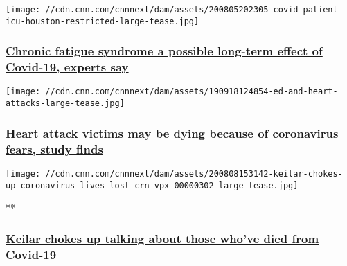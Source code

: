 \href{/2020/08/07/health/chronic-fatigue-syndrome-covid-19-survivors-wellness/index.html}{}

\texttt{[image: //cdn.cnn.com/cnnnext/dam/assets/200805202305-covid-patient-icu-houston-restricted-large-tease.jpg]}

\hypertarget{chronic-fatigue-syndrome-a-possible-long-term-effect-of-covid-19-experts-say-1}{%
\subsubsection{\texorpdfstring{\href{/2020/08/07/health/chronic-fatigue-syndrome-covid-19-survivors-wellness/index.html}{Chronic
fatigue syndrome a possible long-term effect of Covid-19, experts
say}}{Chronic fatigue syndrome a possible long-term effect of Covid-19, experts say}}\label{chronic-fatigue-syndrome-a-possible-long-term-effect-of-covid-19-experts-say-1}}

\href{/2020/08/07/health/heart-attack-avoid-hospital-covid-19-wellness/index.html}{}

\texttt{[image: //cdn.cnn.com/cnnnext/dam/assets/190918124854-ed-and-heart-attacks-large-tease.jpg]}

\hypertarget{heart-attack-victims-may-be-dying-because-of-coronavirus-fears-study-finds}{%
\subsubsection{\texorpdfstring{\href{/2020/08/07/health/heart-attack-avoid-hospital-covid-19-wellness/index.html}{Heart
attack victims may be dying because of coronavirus fears, study
finds}}{Heart attack victims may be dying because of coronavirus fears, study finds}}\label{heart-attack-victims-may-be-dying-because-of-coronavirus-fears-study-finds}}

\href{/videos/health/2020/08/07/keilar-chokes-up-coronavirus-lives-lost-crn-vpx.cnn}{}

\texttt{[image: //cdn.cnn.com/cnnnext/dam/assets/200808153142-keilar-chokes-up-coronavirus-lives-lost-crn-vpx-00000302-large-tease.jpg]}

**

\hypertarget{keilar-chokes-up-talking-about-those-whove-died-from-covid-19}{%
\subsubsection{\texorpdfstring{\href{/videos/health/2020/08/07/keilar-chokes-up-coronavirus-lives-lost-crn-vpx.cnn}{Keilar
chokes up talking about those who've died from
Covid-19}}{Keilar chokes up talking about those who've died from Covid-19}}\label{keilar-chokes-up-talking-about-those-whove-died-from-covid-19}}

